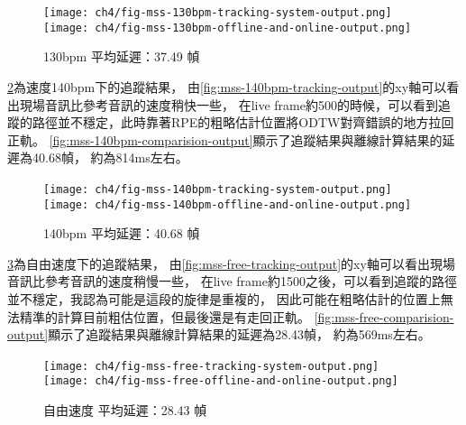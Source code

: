\documentclass[class=NCU_thesis, crop=false]{standalone}
\begin{document}
\begin{figure}[H]
    \centering
    \subcaptionbox
    {
    \label{fig:mss-130bpm-tracking-output}}
    {\texttt{[image: ch4/fig-mss-130bpm-tracking-system-output.png]}}
    ~
    \subcaptionbox
    {
    \label{fig:mss-130bpm-comparision-output}}
    {\texttt{[image: ch4/fig-mss-130bpm-offline-and-online-output.png]}}
    \caption{130bpm 平均延遲：37.49 幀}
    \label{fig:fig-ch4-mss-130bpm-tracking-results}
\end{figure}

\cref{fig:fig-ch4-mss-140bpm-tracking-results}為速度140bpm下的追蹤結果，
由\cref{fig:mss-140bpm-tracking-output}的xy軸可以看出現場音訊比參考音訊的速度稍快一些，
在live frame約500的時候，可以看到追蹤的路徑並不穩定，此時靠著RPE的粗略估計位置將ODTW對齊錯誤的地方拉回正軌。
\cref{fig:mss-140bpm-comparision-output}顯示了追蹤結果與離線計算結果的延遲為40.68幀，
約為814ms左右。

\begin{figure}[H]
    \centering
    \subcaptionbox
    {
    \label{fig:mss-140bpm-tracking-output}}
    {\texttt{[image: ch4/fig-mss-140bpm-tracking-system-output.png]}}
    ~
    \subcaptionbox
    {
    \label{fig:mss-140bpm-comparision-output}}
    {\texttt{[image: ch4/fig-mss-140bpm-offline-and-online-output.png]}}
    \caption{140bpm 平均延遲：40.68 幀}
    \label{fig:fig-ch4-mss-140bpm-tracking-results}
\end{figure}

\cref{fig:fig-ch4-mss-free-tracking-results}為自由速度下的追蹤結果，
由\cref{fig:mss-free-tracking-output}的xy軸可以看出現場音訊比參考音訊的速度稍慢一些，
在live frame約1500之後，可以看到追蹤的路徑並不穩定，我認為可能是這段的旋律是重複的，
因此可能在粗略估計的位置上無法精準的計算目前粗估位置，但最後還是有走回正軌。
\cref{fig:mss-free-comparision-output}顯示了追蹤結果與離線計算結果的延遲為28.43幀，
約為569ms左右。

\begin{figure}[H]
    \centering
    \subcaptionbox
    {
    \label{fig:mss-free-tracking-output}}
    {\texttt{[image: ch4/fig-mss-free-tracking-system-output.png]}}
    ~
    \subcaptionbox
    {
    \label{fig:mss-free-comparision-output}}
    {\texttt{[image: ch4/fig-mss-free-offline-and-online-output.png]}}
    \caption{自由速度 平均延遲：28.43 幀}
    \label{fig:fig-ch4-mss-free-tracking-results}
\end{figure}
\end{document}

